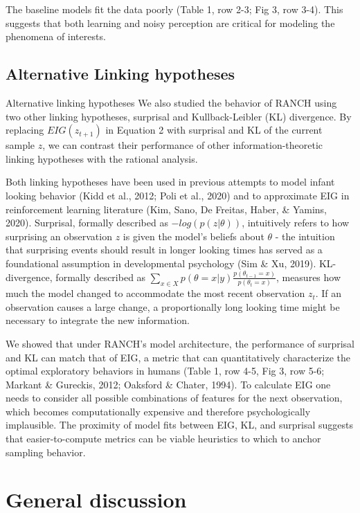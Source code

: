 \documentclass[10pt, letterpaper]{article}
\begin{document}
The baseline models fit the data poorly (Table 1, row 2-3; Fig 3, row
3-4). This suggests that both learning and noisy perception are critical
for modeling the phenomena of interests.

\hypertarget{alternative-linking-hypotheses}{%
\subsection{Alternative Linking
hypotheses}\label{alternative-linking-hypotheses}}

Alternative linking hypotheses We also studied the behavior of RANCH
using two other linking hypotheses, surprisal and Kullback-Leibler (KL)
divergence. By replacing \(EIG(z_{t+1})\) in Equation 2 with surprisal
and KL of the current sample \(z\), we can contrast their performance of
other information-theoretic linking hypotheses with the rational
analysis.

Both linking hypotheses have been used in previous attempts to model
infant looking behavior (Kidd et al., 2012; Poli et al., 2020) and to
approximate EIG in reinforcement learning literature (Kim, Sano, De
Freitas, Haber, \& Yamins, 2020). Surprisal, formally described as
\(-log(p(z|\theta))\), intuitively refers to how surprising an
observation \(z\) is given the model's beliefs about \(\theta\) - the
intuition that surprising events should result in longer looking times
has served as a foundational assumption in developmental psychology (Sim
\& Xu, 2019). KL-divergence, formally described as
\(\sum_{x \in X}{p(\theta = x|y)\frac{p(\theta_{t-1} = x)}{p(\theta_t = x)}}\),
measures how much the model changed to accommodate the most recent
observation \(z_t\). If an observation causes a large change, a
proportionally long looking time might be necessary to integrate the new
information.

We showed that under RANCH's model architecture, the performance of
surprisal and KL can match that of EIG, a metric that can quantitatively
characterize the optimal exploratory behaviors in humans (Table 1, row
4-5, Fig 3, row 5-6; Markant \& Gureckis, 2012; Oaksford \& Chater,
1994). To calculate EIG one needs to consider all possible combinations
of features for the next observation, which becomes computationally
expensive and therefore psychologically implausible. The proximity of
model fits between EIG, KL, and surprisal suggests that
easier-to-compute metrics can be viable heuristics to which to anchor
sampling behavior.

\hypertarget{general-discussion}{%
\section{General discussion}\label{general-discussion}}
\end{document}
